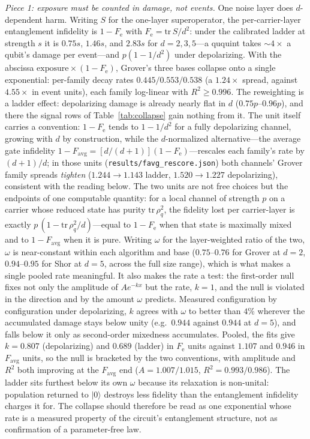 \documentclass[aps,pra,reprint,superscriptaddress,nofootinbib,floatfix]{revtex4-2}
\newcommand{\Fe}{F_{\mathrm{e}}}
\begin{document}
\emph{Piece 1: exposure must be counted in damage, not events.} One
noise layer does $d$-dependent harm. Writing $S$ for the one-layer
superoperator, the per-carrier-layer entanglement infidelity is
$1-\Fe$ with $\Fe=\mathrm{tr}\,S/d^2$: under the calibrated ladder at
strength $s$ it is $0.75s$, $1.46s$, and $2.83s$ for $d=2,3,5$---a
ququint takes ${\sim}4\times$ a qubit's damage per event---and
$p(1-1/d^2)$ under depolarizing. With the abscissa
$\mathrm{exposure}\times(1-\Fe)$, Grover's three bases collapse onto a
single exponential: per-family decay rates $0.445/0.553/0.538$ (a $1.24\times$
spread, against $4.55\times$ in event units), each family log-linear with
$R^2\ge0.996$. The reweighting is a ladder effect: depolarizing
damage is already nearly flat in $d$ ($0.75p$--$0.96p$), and there
the signal rows of Table~\ref{tab:collapse} gain nothing from it.
The unit itself carries a convention: $1-\Fe$ tends to $1-1/d^2$ for
a fully depolarizing channel, growing with $d$ by construction, while
the $d$-normalized alternative---the average gate infidelity
$1-F_{\mathrm{avg}}=[d/(d+1)](1-\Fe)$---rescales each family's rate
by $(d+1)/d$; in those units
(\texttt{results/favg\_rescore.json}) both channels' Grover family
spreads \emph{tighten} ($1.244\to1.143$ ladder,
$1.520\to1.227$ depolarizing), consistent with the reading below.
The two units are not free
choices but the endpoints of one computable quantity: for a
local channel of strength $p$ on a carrier whose reduced state has
purity $\mathrm{tr}\,\rho_q^2$, the fidelity lost per carrier-layer
is exactly $p\,(1-\mathrm{tr}\,\rho_q^2/d)$---equal to $1-\Fe$ when
that state is maximally mixed and to $1-F_{\mathrm{avg}}$
when it is pure. Writing $\omega$ for the layer-weighted ratio of
the two, $\omega$ is near-constant within each algorithm and base
($0.75$--$0.76$ for Grover at $d=2$, $0.94$--$0.95$ for Shor at
$d=5$, across the full size range), which is what makes a single
pooled rate meaningful. It also makes the rate a test: the
first-order null fixes not only the amplitude of $Ae^{-kx}$ but the
rate, $k=1$, and the null is violated in the direction and by the
amount $\omega$ predicts. Measured configuration by configuration
under depolarizing, $k$ agrees with $\omega$ to better than $4\%$
wherever the accumulated damage stays below unity (e.g.\ $0.944$
against $0.944$ at $d=5$), and falls below it only as second-order
mixedness accumulates. Pooled, the fits give $k=0.807$
(depolarizing) and $0.689$ (ladder) in $\Fe$ units against $1.107$
and $0.946$ in $F_{\mathrm{avg}}$ units, so the null is bracketed
by the two conventions, with amplitude and $R^2$ both improving at
the $F_{\mathrm{avg}}$ end ($A=1.007/1.015$, $R^2=0.993/0.986$).
The ladder sits furthest below its own $\omega$ because its
relaxation is non-unital: population returned to $\lvert0\rangle$
destroys less fidelity than the entanglement infidelity charges it
for. The collapse should therefore be read as one exponential whose
rate is a measured property of the circuit's entanglement
structure, not as confirmation of a parameter-free law.
\end{document}
